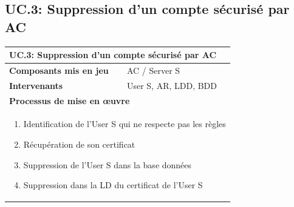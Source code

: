 \documentclass[a4paper,11pt,french]{article}
\begin{document}
\subsection{UC.3: Suppression d'un compte sécurisé par AC}
\begin{center}
	\vspace*{0.7cm}
	\begin{tabularx}{16cm}{|l|X|}
	\hline
	\multicolumn{2}{|l|}{\textbf{UC.3: Suppression d'un compte sécurisé par AC}}\\
	\hline
	\textbf{Composants mis en jeu} & AC / Server S \\
	\hline
	\textbf{Intervenants} & User S, AR, LDD, BDD\\
	\hline
	\multicolumn{2}{|l|}{\textbf{Processus de mise en \oe uvre}}\\
	\hline
	\multicolumn{2}{|p{15cm}|}{\begin{enumerate}\item Identification de l'User S qui ne respecte pas les règles \item Récupération de son certificat \item Suppression de l'User S dans la base données \item Suppression dans la LD du certificat de l'User S \end{enumerate}}\\
	\hline
	\end{tabularx}
\end{center}
\vspace{2cm}
\end{document}
